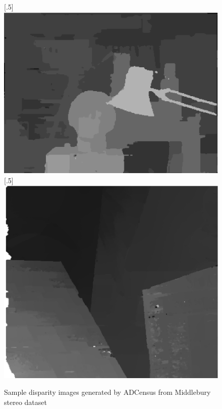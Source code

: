 \begin{figure}[H]
\centering
{}
[.5\linewidth]{\includegraphics[scale=0.5]{tsukubadisp}}%
[.5\linewidth]{\includegraphics[scale=0.51]{venusdisp}}%
\caption{Sample disparity images generated by ADCensus from Middlebury stereo dataset}
\label{fig:midburydisps}
\end{figure}

